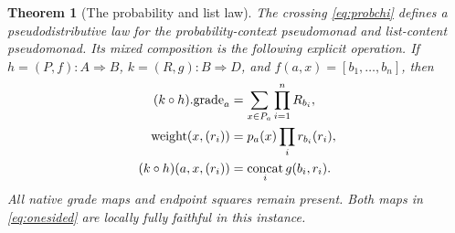 \documentclass[11pt]{article}
\newtheorem{theorem}{Theorem}[section]
\theoremstyle{definition}
\begin{document}
\begin{theorem}[The probability and list law]\label{thm:problaw}
The crossing \eqref{eq:probchi} defines a pseudodistributive law for the
probability-context pseudomonad and list-content pseudomonad. Its mixed
composition is the following explicit operation. If
$h=(P,f):A\Rightarrow B$, $k=(R,g):B\Rightarrow D$, and
$f(a,x)=[b_1,\ldots,b_n]$, then
\begin{align}
 (k\circ h).\mathrm{grade}_a
   &=\sum_{x\in P_a}\prod_{i=1}^nR_{b_i},\label{eq:probgrade}\\
 \mathrm{weight}(x,(r_i))&=p_a(x)\prod_i r_{b_i}(r_i),\notag\\
 (k\circ h)(a,x,(r_i))&=\mathop{\mathrm{concat}}_i g(b_i,r_i).
 \label{eq:proboutput}
\end{align}
All native grade maps and endpoint squares remain present. Both maps in
\eqref{eq:onesided} are locally fully faithful in this instance.
\end{theorem}
\end{document}
